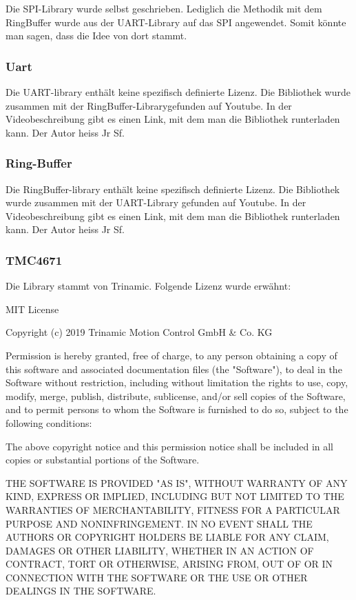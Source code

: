 Die SPI-Library wurde selbst geschrieben. Lediglich die Methodik mit dem RingBuffer wurde aus der UART-Library auf das SPI angewendet. Somit könnte man sagen, dass die Idee von dort stammt.
\cite{user_ring_nodate}

\subsubsection{Uart}\label{subsubsec:Software_Lizenzen_UART}

Die UART-library enthält keine spezifisch definierte Lizenz. Die Bibliothek wurde zusammen mit der RingBuffer-Librarygefunden auf Youtube. In der Videobeschreibung gibt es einen Link, mit dem man die Bibliothek runterladen kann. Der Autor heiss Jr Sf.
\cite{user_ring_nodate}

\subsubsection{Ring-Buffer}\label{subsubsec:Software_Lizenzen_Ring_Buffer}

Die RingBuffer-library enthält keine spezifisch definierte Lizenz. Die Bibliothek wurde zusammen mit der UART-Library gefunden auf Youtube. In der Videobeschreibung gibt es einen Link, mit dem man die Bibliothek runterladen kann. Der Autor heiss Jr Sf.
\cite{user_ring_nodate}

\subsubsection{TMC4671}\label{subsubsec:Software_Lizenzen_TMC4671}

Die Library stammt von Trinamic. Folgende Lizenz wurde erwähnt:

MIT License

Copyright (c) 2019 Trinamic Motion Control GmbH \& Co. KG

Permission is hereby granted, free of charge, to any person obtaining a copy
of this software and associated documentation files (the "Software"), to deal
in the Software without restriction, including without limitation the rights
to use, copy, modify, merge, publish, distribute, sublicense, and/or sell
copies of the Software, and to permit persons to whom the Software is
furnished to do so, subject to the following conditions:

The above copyright notice and this permission notice shall be included in all
copies or substantial portions of the Software.

THE SOFTWARE IS PROVIDED "AS IS", WITHOUT WARRANTY OF ANY KIND, EXPRESS OR
IMPLIED, INCLUDING BUT NOT LIMITED TO THE WARRANTIES OF MERCHANTABILITY,
FITNESS FOR A PARTICULAR PURPOSE AND NONINFRINGEMENT. IN NO EVENT SHALL THE
AUTHORS OR COPYRIGHT HOLDERS BE LIABLE FOR ANY CLAIM, DAMAGES OR OTHER
LIABILITY, WHETHER IN AN ACTION OF CONTRACT, TORT OR OTHERWISE, ARISING FROM,
OUT OF OR IN CONNECTION WITH THE SOFTWARE OR THE USE OR OTHER DEALINGS IN THE
SOFTWARE.

\cite{noauthor_trinamictmc-evalsystem_nodate}